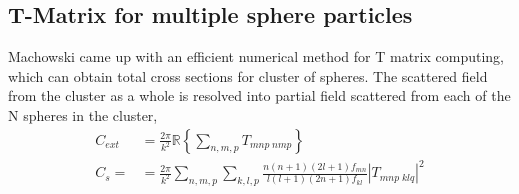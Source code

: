\subsection{T-Matrix for multiple sphere particles}
Machowski came up with an efficient numerical method for T matrix computing, which can obtain total cross sections for cluster of spheres. The scattered field from the cluster as a whole is resolved into partial field scattered from each of the N spheres in the cluster,
\begin{align}
    C_{ext} &= \frac{2\pi}{k^2}\mathbb{R}\left\{\sum_{n,m,p}T_{mnp\;nmp}\right\} \\
    C_s = &= \frac{2\pi}{k^2}\sum_{n,m,p}\sum_{k,l,p}\frac{n(n+1)(2l+1)f_{mn}}{l(l+1)(2n+1)f_{kl}}|T_{mnp\;klq}|^2
\end{align}

